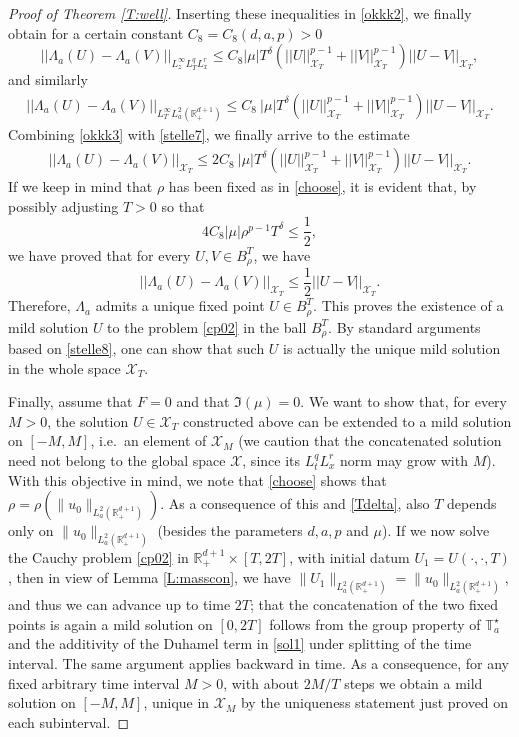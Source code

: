 \documentclass[11pt,letter]{amsart}
\def \RN {\mathbb{R}_+^{d+1}}
\numberwithin{equation}{section}
\newcommand{\Xs}{\mathcal X}
\newcommand{\XT}{\mathcal{X}_T}
\numberwithin{equation}{section}
\begin{document}
\begin{proof}[Proof of Theorem \ref{T:well}]
Inserting these inequalities in \eqref{okkk2}, we finally obtain for a certain constant $C_8 = C_8(d,a,p)>0$
\begin{equation}\label{okkk3}
||\Lambda_a(U) - \Lambda_a(V)||_{L^\infty_{z} L^q_T L^r_x } \le C_8 |\mu| T^{\delta} \left(||U||^{p-1}_{\XT} + ||V||^{p-1}_{\XT}\right) ||U - V||_{\XT},
\end{equation}
and similarly
\begin{align}\label{stelle7}
||\Lambda_a(U) - \Lambda_a(V)||_{L^\infty_T L^2_a(\RN)} \le C_8\ |\mu| T^{\delta} \left(||U||^{p-1}_{\XT} + ||V||^{p-1}_{\XT}\right) ||U - V||_{\XT}. 
\end{align}
Combining \eqref{okkk3} with \eqref{stelle7}, we finally arrive to the estimate
\begin{align}\label{stelle8}
||\Lambda_a(U) - \Lambda_a(V)||_{\XT} \le 2 C_8\ |\mu| T^{\delta} \left(||U||^{p-1}_{\XT} + ||V||^{p-1}_{\XT}\right) ||U - V||_{\XT}. 
\end{align}
If we keep in mind that $\rho$ has been fixed as in \eqref{choose}, it is evident that, by possibly adjusting $T>0$ so that
\begin{equation}\label{Tdelta}
4 C_8 |\mu| \rho^{p-1} T^{\delta} \le \frac 12,
\end{equation}
we have proved that for every $U, V \in B^T_\rho$, we have
\[
||\Lambda_a(U) - \Lambda_a(V)||_{\XT} \le \frac 12 ||U-V||_{\XT}.
\]
Therefore, $\Lambda_a$ admits a unique fixed point $U\in B^T_\rho$. This proves the existence of a mild solution $U$ to the problem \eqref{cp02} in the ball $B^T_\rho$. By standard arguments based on \eqref{stelle8}, one can show that such $U$ is actually the unique mild solution in the whole space $\XT$. 

Finally, assume that $F= 0$ and that $\Im(\mu) = 0$. We want to show that, for every $M>0$, the solution $U\in \XT$ constructed above can be extended to a mild solution on $[-M,M]$, i.e.\ an element of $\mathcal X_M$ (we caution that the concatenated solution need not belong to the global space $\Xs$, since its $L^q_tL^r_x$ norm may grow with $M$). With this objective in mind, we note that \eqref{choose} shows that  $\rho=\rho(\|u_0\|_{L^2_a(\RN)})$. As a consequence of this and \eqref{Tdelta}, also $T$ depends only on $\|u_0\|_{L^2_a(\RN)}$ (besides the parameters $d, a, p$ and $\mu$). If we now solve the Cauchy problem \eqref{cp02} in $\RN\times[T,2T]$, with initial datum $U_1 = U(\cdot,\cdot,T)$, then in view of Lemma \ref{L:masscon}, we have $\|U_1\|_{{L^2_a(\RN)}}= \|u_0\|_{L^2_a(\RN)}$, and thus we can advance up to time  $2T$; that the concatenation of the two fixed points is again a mild solution on $[0,2T]$ follows from the group property of $\mathbb T^\star_a$ and the additivity of the Duhamel term in \eqref{sol1} under splitting of the time interval. The same argument applies backward in time. As a consequence, for any fixed arbitrary time interval $M>0$, with about $2M/T$ steps we obtain a mild solution on $[-M,M]$, unique in $\mathcal X_M$ by the uniqueness statement just proved on each subinterval.  

\end{proof}
\end{document}
